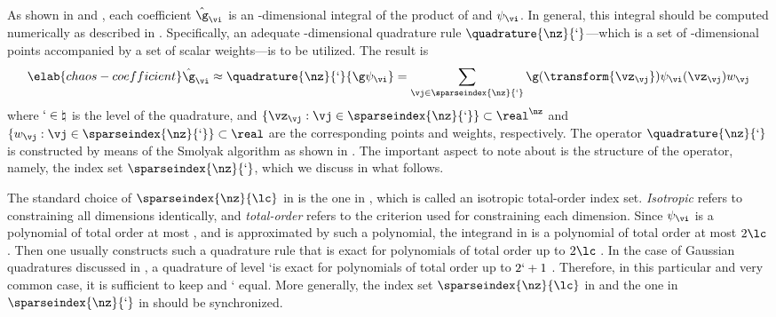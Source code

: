 As shown in  and , each
coefficient $\hat{\g}_{\vi}$ is an \nz-dimensional integral of the product of \g
and $\psi_{\vi}$. In general, this integral should be computed numerically as
described in . Specifically, an adequate
\nz-dimensional quadrature rule $\quadrature{\nz}{\lq}$---which is a set of
\nz-dimensional points accompanied by a set of scalar weights---is to be
utilized. The result is
\begin{equation} \elab{chaos-coefficient}
  \hat{\g}_{\vi} \approx \quadrature{\nz}{\lq}{\g \psi_{\vi}}
  = \sum_{\vj \in \sparseindex{\nz}{\lq}} \g(\transform{\vz_{\vj}}) \psi_{\vi}(\vz_{\vj}) w_{\vj}
\end{equation}
where $\lq \in \natural$ is the level of the quadrature, and $\{ \vz_{\vj}: \vj
\in \sparseindex{\nz}{\lq} \} \subset \real^\nz$ and $\{ w_{\vj}: \vj \in
\sparseindex{\nz}{\lq}  \} \subset \real$ are the corresponding points and
weights, respectively. The operator $\quadrature{\nz}{\lq}$ is constructed by
means of the Smolyak algorithm \cite{smolyak1963} as shown in
. The important aspect to note about
 is the structure of the operator, namely, the index set
$\sparseindex{\nz}{\lq}$, which we discuss in what follows.

The standard choice of $\sparseindex{\nz}{\lc}$ in  is the
one in , which is called an isotropic
total-order index set. \emph{Isotropic} refers to constraining all dimensions
identically, and \emph{total-order} refers to the criterion used for
constraining each dimension. Since $\psi_{\vi}$ is a polynomial of total order
at most \lc, and \g is approximated by such a polynomial, the integrand in
 is a polynomial of total order at most $2 \lc$. Then
one usually constructs such a quadrature rule that is exact for polynomials of
total order up to $2 \lc$ \cite{eldred2008}. In the case of Gaussian quadratures
discussed in , a quadrature of level \lq is exact for
polynomials of total order up to $2 \lq + 1$ \cite{heiss2008}. Therefore, in
this particular and very common case, it is sufficient to keep \lc and \lq
equal. More generally, the index set $\sparseindex{\nz}{\lc}$ in
 and the one in $\sparseindex{\nz}{\lq}$ in
 should be synchronized.

